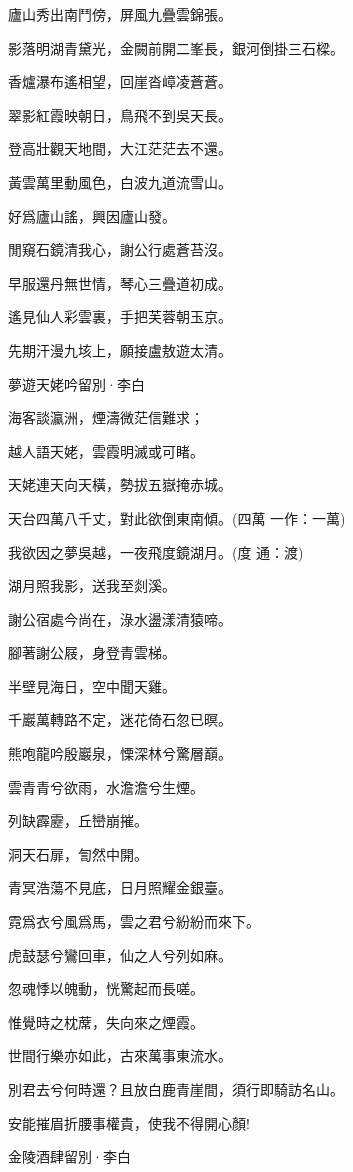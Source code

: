 \documentclass[12pt,a4paper]{ctexbook}
\begin{document}
廬山秀出南鬥傍，屏風九疊雲錦張。\par
影落明湖青黛光，金闕前開二峯長，銀河倒掛三石樑。\par
香爐瀑布遙相望，回崖沓嶂凌蒼蒼。\par
翠影紅霞映朝日，鳥飛不到吳天長。\par
登高壯觀天地間，大江茫茫去不還。\par
黃雲萬里動風色，白波九道流雪山。\par
好爲廬山謠，興因廬山發。\par
閒窺石鏡清我心，謝公行處蒼苔沒。\par
早服還丹無世情，琴心三疊道初成。\par
遙見仙人彩雲裏，手把芙蓉朝玉京。\par
先期汗漫九垓上，願接盧敖遊太清。\par
夢遊天姥吟留別·李白\par
海客談瀛洲，煙濤微茫信難求；\par
越人語天姥，雲霞明滅或可睹。\par
天姥連天向天橫，勢拔五嶽掩赤城。\par
天台四萬八千丈，對此欲倒東南傾。(四萬 一作：一萬)\par
我欲因之夢吳越，一夜飛度鏡湖月。(度 通：渡)\par
湖月照我影，送我至剡溪。\par
謝公宿處今尚在，淥水盪漾清猿啼。\par
腳著謝公屐，身登青雲梯。\par
半壁見海日，空中聞天雞。\par
千巖萬轉路不定，迷花倚石忽已暝。\par
熊咆龍吟殷巖泉，慄深林兮驚層巔。\par
雲青青兮欲雨，水澹澹兮生煙。\par
列缺霹靂，丘巒崩摧。\par
洞天石扉，訇然中開。\par
青冥浩蕩不見底，日月照耀金銀臺。\par
霓爲衣兮風爲馬，雲之君兮紛紛而來下。\par
虎鼓瑟兮鸞回車，仙之人兮列如麻。\par
忽魂悸以魄動，恍驚起而長嗟。\par
惟覺時之枕蓆，失向來之煙霞。\par
世間行樂亦如此，古來萬事東流水。\par
別君去兮何時還？且放白鹿青崖間，須行即騎訪名山。\par
安能摧眉折腰事權貴，使我不得開心顏!\par
金陵酒肆留別·李白\par
\end{document}
